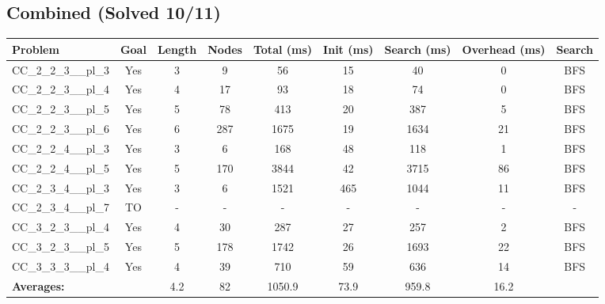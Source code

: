 \documentclass{article}
\begin{document}
\subsection*{Combined (Solved 10/11)}
\begin{tabular}{lcccccccc}
\toprule
Problem & Goal & Length & Nodes & Total (ms) & Init (ms) & Search (ms) & Overhead (ms) & Search \\
\midrule
CC\_2\_2\_3\_\_pl\_3 & Yes & 3 & 9 & 56 & 15 & 40 & 0 & BFS \\
CC\_2\_2\_3\_\_pl\_4 & Yes & 4 & 17 & 93 & 18 & 74 & 0 & BFS \\
CC\_2\_2\_3\_\_pl\_5 & Yes & 5 & 78 & 413 & 20 & 387 & 5 & BFS \\
CC\_2\_2\_3\_\_pl\_6 & Yes & 6 & 287 & 1675 & 19 & 1634 & 21 & BFS \\
CC\_2\_2\_4\_\_pl\_3 & Yes & 3 & 6 & 168 & 48 & 118 & 1 & BFS \\
CC\_2\_2\_4\_\_pl\_5 & Yes & 5 & 170 & 3844 & 42 & 3715 & 86 & BFS \\
CC\_2\_3\_4\_\_pl\_3 & Yes & 3 & 6 & 1521 & 465 & 1044 & 11 & BFS \\
CC\_2\_3\_4\_\_pl\_7 & TO & - & - & - & - & - & - & - \\
CC\_3\_2\_3\_\_pl\_4 & Yes & 4 & 30 & 287 & 27 & 257 & 2 & BFS \\
CC\_3\_2\_3\_\_pl\_5 & Yes & 5 & 178 & 1742 & 26 & 1693 & 22 & BFS \\
CC\_3\_3\_3\_\_pl\_4 & Yes & 4 & 39 & 710 & 59 & 636 & 14 & BFS \\
\textbf{Averages:} & & 4.2 & 82 & 1050.9 & 73.9 & 959.8 & 16.2 & \\
\bottomrule
\end{tabular}
\\[0.7cm]
\end{document}
